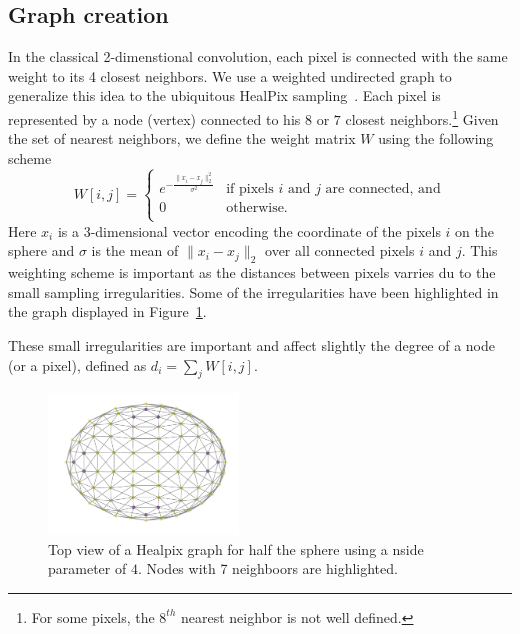 \documentclass[final,twocolumn,3p,times,authoryear]{elsarticle}
\newcommand{\1}{\b{1}}              %
\newcommand{\0}{\b{0}}              %
\begin{document}
\subsection{Graph creation}
In the classical 2-dimenstional convolution, each pixel is connected with the
same weight to its 4 closest neighbors. We use a weighted undirected graph to
generalize this idea to the ubiquitous HealPix
sampling~\citep{gorski2005healpix}.  Each pixel is represented by a node
(vertex) connected to his $8$ or $7$ closest neighbors.\footnote{For some
pixels, the $8^{th}$ nearest neighbor is not well defined.} Given the set of
nearest neighbors, we define the weight matrix $W$ using the following scheme
\begin{equation}
W[i,j]=\begin{cases}
e^{-\frac{\|x_i-x_j\|_2^2}{\sigma^2}} & \text{if pixels $i$ and $j$ are connected, and}\\
0 & \text{otherwise.}\\
\end{cases}
\end{equation}
Here $x_i$ is a 3-dimensional vector encoding the coordinate of the pixels $i$
on the sphere and $\sigma$ is the mean of $\|x_i-x_j\|_2$ over all connected
pixels $i$ and $j$. This weighting scheme is important as the distances between
pixels varries du to the small sampling irregularities. Some of the
irregularities have been highlighted in the graph displayed in
Figure~\ref{fig:healpix_graph_4}.

These small irregularities are important and affect slightly the degree of a 
node (or a pixel), defined as $d_i =\sum_j W[i,j]$. 

\begin{figure}[!ht]
\centering
\vspace{-0.5cm}
\includegraphics[width=0.45\textwidth]{figures/half_graph_4.pdf}
\vspace{-0.5cm}
\caption{
Top view of a Healpix graph for half the sphere using a nside parameter of $4$.
Nodes with 7 neighboors are highlighted.
}
\label{fig:healpix_graph_4}
\end{figure}
\end{document}
